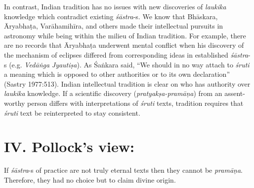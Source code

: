 In contrast, Indian tradition has no issues with new discoveries of {\sl laukika} knowledge which contradict existing {\sl śāstra}-s.  We know that Bhāskara, Āryabhaṭa, Varāhamihīra, and others made their intellectual pursuits in astronomy while being within the milieu of Indian tradition.  For example, there are no records that Āryabhaṭa underwent mental conflict when his discovery of the mechanism of eclipses differed from corresponding ideas in established \hbox{{\sl śāstra}-s} (e.g. {\sl Vedāṅga} {\sl Jyautiṣa}). As Śaṅkara said,  ``We should in no way attach to {\sl śruti} a meaning which is opposed to other authorities or to its own declaration'' (Sastry 1977:513). Indian intellectual tradition is clear on who has authority over {\sl laukika} knowledge.  If a scientific discovery ({\sl pratyakṣa-pramāṇa}) from an assent-worthy person differs with interpretations of {\sl śruti} texts, tradition requires that {\sl śruti} text be reinterpreted to stay consistent.

\section*{IV. Pollock's view:}

If {{\sl śāstra}\relax}-s of practice are not truly eternal texts then they cannot be {{\sl pramāṇa}\relax}.  Therefore, they had no choice but to claim divine origin.

